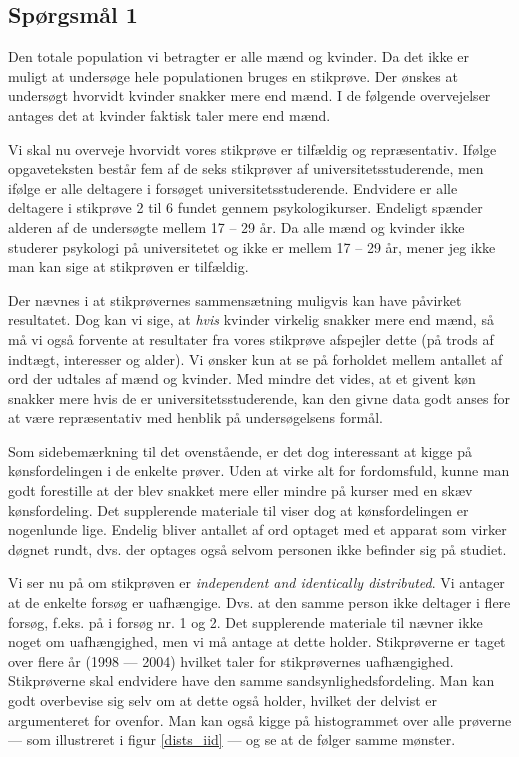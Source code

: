 \documentclass[a4paper, 10pt, danish, final]{article}
\title{\mytitle}
\subtitle{\mysubtitle}
\author{\myauthor{} - \mymail}
\date{\mydate}
\begin{document}
\maketitle

\subsection*{Spørgsmål 1}
Den totale population vi betragter er alle mænd og kvinder. Da det ikke
er muligt at undersøge hele populationen bruges en stikprøve. Der ønskes
at undersøgt hvorvidt kvinder snakker mere end mænd. I de følgende
overvejelser antages det at kvinder faktisk taler mere end mænd.

Vi skal nu overveje hvorvidt vores stikprøve er tilfældig og
repræsentativ. Ifølge opgaveteksten består fem af de seks stikprøver af
universitetsstuderende, men ifølge \citep{mehl2007women} er alle
deltagere i forsøget universitetsstuderende. Endvidere er alle deltagere
i stikprøve 2 til 6 fundet gennem psykologikurser. Endeligt spænder
alderen af de undersøgte mellem 17 -- 29 år. Da alle mænd og kvinder
ikke studerer psykologi på universitetet og ikke er mellem 17 -- 29 år,
mener jeg ikke man kan sige at stikprøven er tilfældig.

Der nævnes i \citep{mehl2007women} at stikprøvernes sammensætning
muligvis kan have påvirket resultatet. Dog kan vi sige, at \emph{hvis}
kvinder virkelig snakker mere end mænd, så må vi også forvente at
resultater fra vores stikprøve afspejler dette (på trods af indtægt,
interesser og alder). Vi ønsker kun at se på forholdet mellem antallet
af ord der udtales af mænd og kvinder. Med mindre det vides, at et
givent køn snakker mere hvis de er universitetsstuderende, kan den givne
data godt anses for at være repræsentativ med henblik på undersøgelsens
formål.

Som sidebemærkning til det ovenstående, er det dog interessant at kigge
på kønsfordelingen i de enkelte prøver. Uden at virke alt for
fordomsfuld, kunne man godt forestille at der blev snakket mere eller
mindre på kurser med en skæv kønsfordeling. Det supplerende materiale
til \citep{mehl2007women} viser dog at kønsfordelingen er nogenlunde
lige. Endelig bliver antallet af ord optaget med et apparat som virker
døgnet rundt, dvs. der optages også selvom personen ikke befinder sig på
studiet.

Vi ser nu på om stikprøven er \emph{independent and identically
distributed}. Vi antager at de enkelte forsøg er uafhængige. Dvs. at den
samme person ikke deltager i flere forsøg, f.eks. på i forsøg nr. 1 og
2. Det supplerende materiale til \citep{mehl2007women} nævner ikke noget
om uafhængighed, men vi må antage at dette holder. Stikprøverne er taget
over flere år (1998 --- 2004) hvilket taler for stikprøvernes
uafhængighed. Stikprøverne skal endvidere have den samme
sandsynlighedsfordeling. Man kan godt overbevise sig selv om at dette
også holder, hvilket der delvist er argumenteret for ovenfor. Man kan
også kigge på histogrammet over alle prøverne --- som illustreret i
figur \ref{dists_iid} --- og se at de følger samme mønster.
\end{document}

